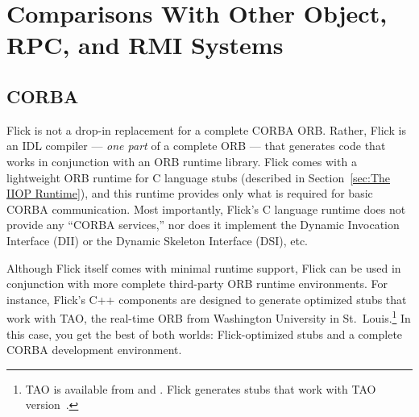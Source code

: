 

\section{Comparisons With Other Object, RPC, and RMI Systems}
\label{sec:Comparisons With Other Object, RPC, and RMI Systems}



\subsection{CORBA}
\label{subsec:CORBA}

Flick is not a drop-in replacement for a complete CORBA ORB\@.  Rather, Flick
is an IDL compiler --- \emph{one part} of a complete ORB --- that generates
code that works in conjunction with an ORB runtime library.  Flick comes with a
lightweight ORB runtime for C language stubs (described in Section~\ref{sec:The
IIOP Runtime}), and this runtime provides only what is required for basic CORBA
communication.  Most importantly, Flick's C language runtime does not provide
any ``CORBA services,'' nor does it implement the Dynamic Invocation Interface
(DII) or the Dynamic Skeleton Interface (DSI), etc.

Although Flick itself comes with minimal runtime support, Flick can be used in
conjunction with more complete third-party ORB runtime environments.  For
instance, Flick's C++ components are designed to generate optimized stubs that
work with TAO, the real-time ORB from Washington University in St.\
Louis.\footnote{TAO is available from \taourl{} and \taosrcurl{}.  Flick
generates stubs that work with TAO version~\taoversion{}.}  In this case, you
get the best of both worlds: Flick-optimized stubs and a complete CORBA
development environment.

